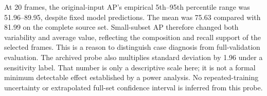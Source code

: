 At 20 frames, the original-input AP's empirical 5th--95th percentile
range was 51.96--89.95, despite fixed model predictions. The mean was
75.63 compared with 81.99 on the complete source set. Small-subset AP
therefore changed both variability and average value, reflecting the
composition and recall support of the selected frames. This is a
reason to distinguish case diagnosis from full-validation evaluation.
The archived probe also multiplies standard deviation by 1.96 under a
sensitivity label. That number is only a descriptive scale here; it is
not a formal minimum detectable effect established by a power analysis.
No repeated-training uncertainty or extrapolated full-set confidence
interval is inferred from this probe.
